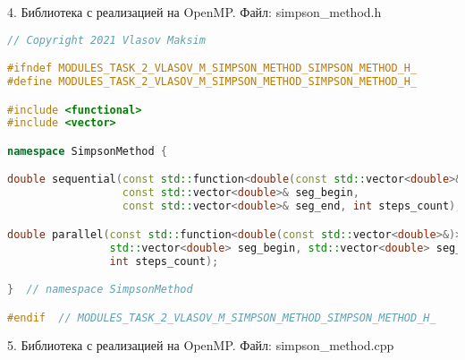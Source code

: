 \documentclass{report}
\begin{document}
\par 4. Библиотека с реализацией на OpenMP. Файл: simpson\_method.h

\begin{lstlisting}[language=C++]
// Copyright 2021 Vlasov Maksim

#ifndef MODULES_TASK_2_VLASOV_M_SIMPSON_METHOD_SIMPSON_METHOD_H_
#define MODULES_TASK_2_VLASOV_M_SIMPSON_METHOD_SIMPSON_METHOD_H_

#include <functional>
#include <vector>

namespace SimpsonMethod {

double sequential(const std::function<double(const std::vector<double>&)>& func,
                  const std::vector<double>& seg_begin,
                  const std::vector<double>& seg_end, int steps_count);

double parallel(const std::function<double(const std::vector<double>&)>& func,
                std::vector<double> seg_begin, std::vector<double> seg_end,
                int steps_count);

}  // namespace SimpsonMethod

#endif  // MODULES_TASK_2_VLASOV_M_SIMPSON_METHOD_SIMPSON_METHOD_H_
\end{lstlisting}

\par 5. Библиотека с реализацией на OpenMP. Файл: simpson\_method.cpp
\end{document}
